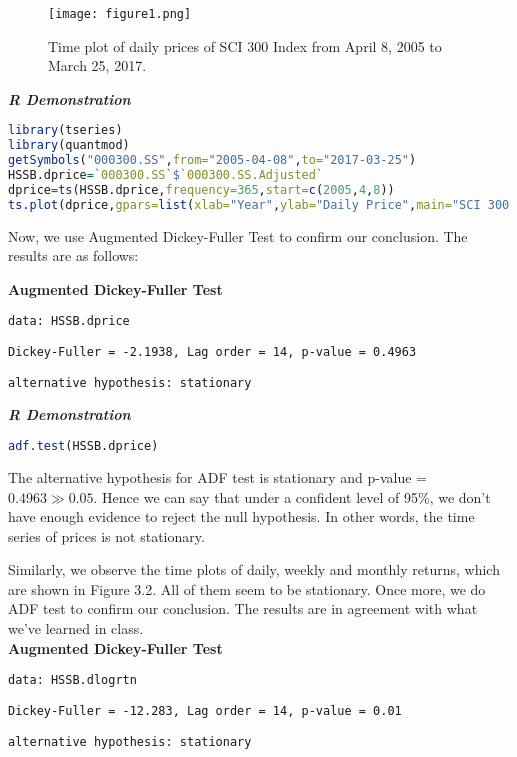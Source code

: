 \documentclass[paper=a4, fontsize=11pt]{scrartcl} %
\numberwithin{equation}{section} %
\numberwithin{figure}{section} %
\numberwithin{table}{section} %
\begin{document}
\begin{figure}[H]
  \centering
  \texttt{[image: figure1.png]}\\
  \caption{Time plot of daily prices of SCI 300 Index from April 8, 2005 to March 25, 2017.}
\end{figure}

\textbf{\textit{R Demonstration}}

\begin{lstlisting}[language=R]
library(tseries)
library(quantmod)
getSymbols("000300.SS",from="2005-04-08",to="2017-03-25")
HSSB.dprice=`000300.SS`$`000300.SS.Adjusted`
dprice=ts(HSSB.dprice,frequency=365,start=c(2005,4,8))
ts.plot(dprice,gpars=list(xlab="Year",ylab="Daily Price",main="SCI 300 Index [2005/4/8-2017/3/25]",col="blue"))
\end{lstlisting}

\bigskip
\bigskip
\bigskip

Now, we use Augmented Dickey-Fuller Test to confirm our conclusion. The results are as follows:\par
\textbf{Augmented Dickey-Fuller Test}\par
\texttt{data:  HSSB.dprice}\par
\texttt{Dickey-Fuller = -2.1938, Lag order = 14, p-value = 0.4963}\par
\texttt{alternative hypothesis: stationary}\par

\bigskip

\textbf{\textit{R Demonstration}}

\begin{lstlisting}[language=R]
adf.test(HSSB.dprice)
\end{lstlisting}


\bigskip
\bigskip
The alternative hypothesis for ADF test is stationary and p-value = $0.4963\gg0.05$. Hence we can say that under a confident level of 95\%, we don't have enough evidence to reject the null hypothesis. In other words, the time series of prices is not stationary.\par
\bigskip
\bigskip
\bigskip
\bigskip
Similarly, we observe the time plots of daily, weekly and monthly returns, which are shown in Figure 3.2. All of them seem to be stationary. Once more, we do ADF test to confirm our conclusion. The results are in agreement with what we've learned in class.\\

\textbf{Augmented Dickey-Fuller Test}\par
\texttt{data:  HSSB.dlogrtn}\par
\texttt{Dickey-Fuller = -12.283, Lag order = 14, p-value = 0.01}\par
\texttt{alternative hypothesis: stationary}\par
\end{document}
